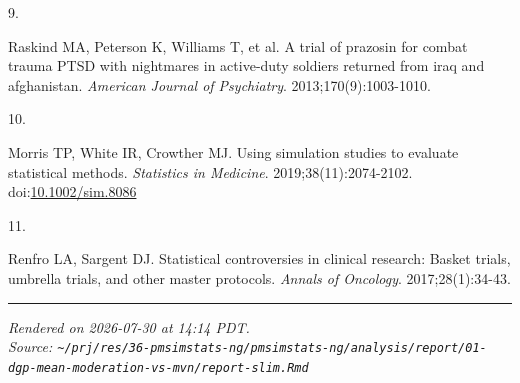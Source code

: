 \documentclass[
  11pt,
]{article}
\newlength{\cslhangindent}
\newlength{\csllabelwidth}
\newenvironment{CSLReferences}[2] %
 {\begin{list}{}{%
  \setlength{\itemindent}{0pt}
  \setlength{\leftmargin}{0pt}
  \setlength{\parsep}{0pt}
  \ifodd #1
   \setlength{\leftmargin}{\cslhangindent}
   \setlength{\itemindent}{-1\cslhangindent}
  \fi
  \setlength{\itemsep}{#2\baselineskip}}}
 {\end{list}}
\newcommand{\CSLLeftMargin}[1]{\parbox[t]{\csllabelwidth}{\strut#1\strut}}
\newcommand{\CSLRightInline}[1]{\parbox[t]{\linewidth - \csllabelwidth}{\strut#1\strut}}
\begin{document}
\begin{CSLReferences}{0}{1}
\CSLLeftMargin{9. }%
\CSLRightInline{{Raskind MA, Peterson K, Williams T, et al.} A trial of
prazosin for combat trauma {PTSD} with nightmares in active-duty
soldiers returned from iraq and afghanistan. \emph{American Journal of
Psychiatry}. 2013;170(9):1003-1010.}

\CSLLeftMargin{10. }%
\CSLRightInline{Morris TP, White IR, Crowther MJ. Using simulation
studies to evaluate statistical methods. \emph{Statistics in Medicine}.
2019;38(11):2074-2102.
doi:\href{https://doi.org/10.1002/sim.8086}{10.1002/sim.8086}}

\CSLLeftMargin{11. }%
\CSLRightInline{Renfro LA, Sargent DJ. Statistical controversies in
clinical research: Basket trials, umbrella trials, and other master
protocols. \emph{Annals of Oncology}. 2017;28(1):34-43.}

\end{CSLReferences}

\vfill

\begin{center}\rule{0.5\linewidth}{0.5pt}\end{center}

\emph{Rendered on 2026-07-30 at 14:14 PDT.}\\
\emph{Source:
\texttt{\textasciitilde{}/prj/res/36-pmsimstats-ng/pmsimstats-ng/analysis/report/01-dgp-mean-moderation-vs-mvn/report-slim.Rmd}}
\end{document}
